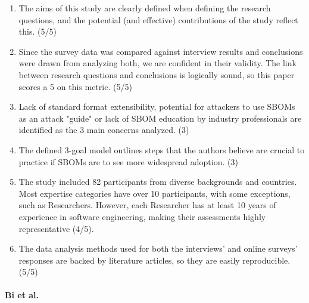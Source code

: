 \begin{enumerate}
    \item The aims of this study are clearly defined when defining the research questions, and the potential (and effective) contributions of the study reflect this. (5/5)
    \item Since the survey data was compared against interview results and conclusions were drawn from analyzing both, we are confident in their validity. The link between research questions and conclusions is logically sound, so this paper scores a 5 on this metric. (5/5)
    \item Lack of standard format extensibility, potential for attackers to use SBOMs as an attack "guide" or lack of SBOM education by industry professionals are identified as the 3 main concerns analyzed. (3)
    \item The defined 3-goal model outlines steps that the authors believe are crucial to practice if SBOMs are to see more widespread adoption. (3)
    \item The study included 82 participants from diverse backgrounds and countries. Most expertise categories have over 10 participants, with some exceptions, such as Researchers. However, each Researcher has at least 10 years of experience in software engineering, making their assessments highly representative (4/5).
    \item The data analysis methods used for both the interviews' and online surveys' responses are backed by literature articles, so they are easily reproducible. (5/5)
\end{enumerate}

\paragraph{Bi et al. \cite{article:sboms-issues-solutions}}


